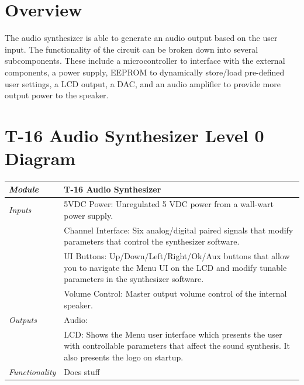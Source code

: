 \documentclass{article}
\begin{document}
\newenvironment{frcseries}{\fontfamily{frc}\selectfont}{}
\newcommand{\textfrc}[1]{{\frcseries#1}}
\newcommand{\mathfrc}[1]{\text{\textfrc{#1}}}

\section{Overview}
The audio synthesizer is able to generate an audio output based on the user input.  The functionality of the circuit can be broken down into several subcomponents.  These include a microcontroller to interface with the external components, a power supply, EEPROM to dynamically store/load pre-defined user settings, a LCD output, a DAC, and an audio amplifier to provide more output power to the speaker.

\section{T-16 Audio Synthesizer Level 0 Diagram}

\begin{tabular}{|p{1in}|p{5in}|}
\hline
\emph{Module} & T-16 Audio Synthesizer \\
\hline
\emph{Inputs}& 5VDC Power: Unregulated 5 VDC power from a wall-wart power supply.\\
	     & Channel Interface: Six analog/digital paired signals that modify parameters that control the synthesizer software. \\
      	     & UI Buttons: Up/Down/Left/Right/Ok/Aux buttons that allow you to navigate the Menu UI on the LCD and modify tunable parameters in the synthesizer software.\\
	     & Volume Control: Master output volume control of the internal speaker.\\
\hline
\emph{Outputs}& Audio: \\ 
	      & LCD: Shows the Menu user interface which presents the user with controllable parameters that affect the sound synthesis. It also presents the logo on startup. \\
\hline
\emph{Functionality}& Does stuff \\
\hline
\end{tabular}
\end{document}
